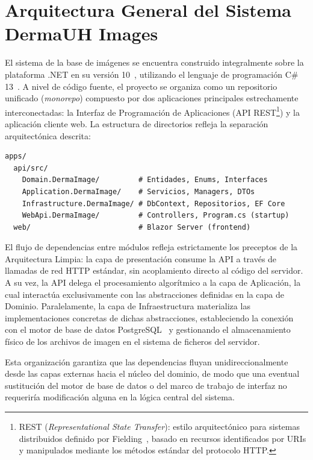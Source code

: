 \section{Arquitectura General del Sistema DermaUH Images}
El sistema de la base de imágenes se encuentra construido integralmente sobre la plataforma .NET en su 
versión 10~\cite{aspnet_core_docs}, utilizando el lenguaje de programación C\# 13~\cite{csharp_13_docs}. 
A nivel de código fuente, el proyecto se organiza como un repositorio unificado (\textit{monorepo}) 
compuesto por dos aplicaciones principales estrechamente interconectadas: la Interfaz de Programación de 
Aplicaciones (API REST\footnote{REST (\textit{Representational State Transfer}): estilo arquitectónico 
para sistemas distribuidos definido por Fielding~\cite{fielding_rest}, basado en recursos identificados 
por URIs y manipulados mediante los métodos estándar del protocolo HTTP.}) y la aplicación cliente web. 
La estructura de directorios refleja la separación arquitectónica descrita:

\begin{lstlisting}[caption={Estructura de directorios del monorepo DermaUH.},label={lst:dir_structure},language={}]
apps/
  api/src/
    Domain.DermaImage/         # Entidades, Enums, Interfaces
    Application.DermaImage/    # Servicios, Managers, DTOs
    Infrastructure.DermaImage/ # DbContext, Repositorios, EF Core
    WebApi.DermaImage/         # Controllers, Program.cs (startup)
  web/                         # Blazor Server (frontend)
\end{lstlisting}

El flujo de dependencias entre módulos refleja estrictamente los preceptos de la Arquitectura Limpia: la 
capa de presentación consume la API a través de llamadas de red HTTP estándar, sin acoplamiento directo al 
código del servidor. A su vez, la API delega el procesamiento algorítmico a la capa de Aplicación, la cual 
interactúa exclusivamente con las abstracciones definidas en la capa de Dominio. Paralelamente, la capa de 
Infraestructura materializa las implementaciones concretas de dichas abstracciones, estableciendo la 
conexión con el motor de base de datos PostgreSQL~\cite{postgresql_docs} y gestionando el almacenamiento 
físico de los archivos de imagen en el sistema de ficheros del servidor.

Esta organización garantiza que las dependencias fluyan unidireccionalmente desde las capas externas hacia 
el núcleo del dominio, de modo que una eventual sustitución del motor de base de datos o del marco de 
trabajo de interfaz no requeriría modificación alguna en la lógica central del sistema.

